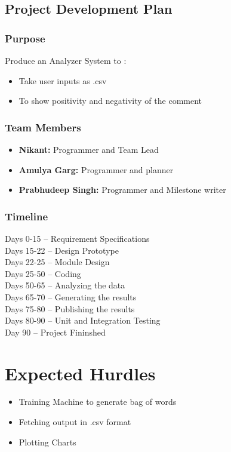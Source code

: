 \subsection{Project Development Plan}
\subsubsection{Purpose}
Produce an Analyzer System to :
\begin{itemize}
	\item Take user inputs as .csv
	\item To show positivity and negativity of the comment
\end{itemize}

\subsubsection{Team Members}
\begin{itemize}
	\item \textbf {Nikant: } Programmer and Team Lead
	\item \textbf {Amulya Garg: } Programmer and planner
	\item \textbf{Prabhudeep Singh: } Programmer and Milestone writer
\end{itemize}

\subsubsection{Timeline}
Days 0-15 -- Requirement Specifications \\
Days 15-22 -- Design Prototype\\
Days 22-25 -- Module Design\\
Days 25-50 -- Coding\\
Days 50-65 -- Analyzing the data \\
Days 65-70 -- Generating the results \\
Days 75-80 -- Publishing the results \\
Days 80-90 -- Unit and Integration Testing \\ 
Day  90    -- Project Fininshed

\section{Expected Hurdles}
\begin{itemize}
	\item Training Machine to generate bag of words 
	\item Fetching output in .csv format
	\item Plotting Charts
\end{itemize}

